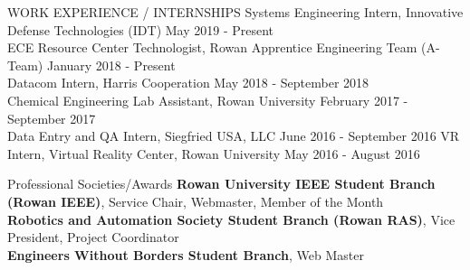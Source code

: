 \documentclass{resume} %
\begin{document}

\begin{rSection}{WORK EXPERIENCE / INTERNSHIPS} \itemsep -3pt
{Systems Engineering Intern, Innovative Defense Technologies (IDT)} \hfill May 2019 - Present\\
{ECE Resource Center Technologist, Rowan Apprentice Engineering Team (A-Team)} \hfill January 2018 - Present\\
{Datacom Intern, Harris Cooperation} \hfill May 2018 - September 2018\\
{Chemical Engineering Lab Assistant, Rowan University} \hfill February 2017 - September 2017\\
{Data Entry and QA Intern, Siegfried USA, LLC} \hfill June 2016 - September 2016
{VR Intern, Virtual Reality Center, Rowan University} \hfill May 2016 - August 2016
\end{rSection}

\begin{rSection}{Professional Societies/Awards} \itemsep -3pt
{\textbf{Rowan University IEEE Student Branch (Rowan IEEE)}, Service Chair,
  Webmaster, Member of the Month}\\
{\textbf{Robotics and Automation Society Student Branch (Rowan RAS)}, Vice
  President, Project Coordinator}\\
{\textbf{Engineers Without Borders Student Branch}, Web Master}\\
\end{rSection}
\end{document}

